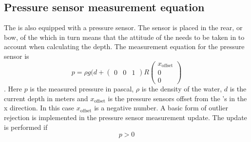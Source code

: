\subsection{Pressure sensor measurement equation}
The \abbrROV is also equipped with a pressure sensor. The sensor is placed in the rear, or bow, of the \abbrROV which in turn means that the attitude of the \abbrROV needs to be taken in to account when calculating the depth.
The measurement equation for the pressure sensor is
\begin{equation}
p =  \rho g (d + \begin{pmatrix}
    0 & 0 & 1
\end{pmatrix} R 
\begin{pmatrix}
x_{\textrm{offset}}\\
0\\
0
\end{pmatrix}
\end{equation}.
Here $p$ is the measured pressure in pascal, $\rho$ is the density of the water, $d$ is the current depth in meters and $x_{\textrm{offset}}$ is the pressure sensors offset from the \abbrROV's \abbrCO in the x direction. In this case $x_{\textrm{offset}}$ is a negative number. A basic form of outlier rejection is implemented in the pressure sensor measurement update. The update is performed if
\begin{equation}
    p > 0
\end{equation}